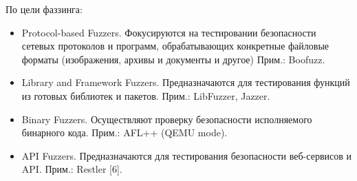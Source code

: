 По цели фаззинга:
\begin{itemize}
	\item Protocol-based Fuzzers. Фокусируются на тестировании безопасности сетевых протоколов и программ, обрабатывающих конкретные файловые форматы (изображения, архивы и документы и другое) Прим.: Boofuzz.
	\item Library and Framework Fuzzers. Предназначаются для тестирования функций из готовых библиотек и пакетов. Прим.: LibFuzzer, Jazzer.
	\item Binary Fuzzers. Осуществляют проверку безопасности исполняемого бинарного кода. Прим.: AFL++ (QEMU mode).
	\item API Fuzzers. Предназначаются для тестирования безопасности веб-сервисов и API. Прим.: Restler [6]. 
\end{itemize}



%
%
%
%


